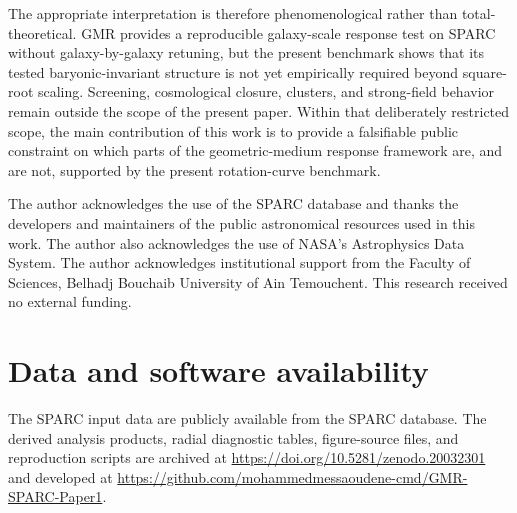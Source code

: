 ﻿\documentclass[twocolumn]{aastex701}
\begin{document}
The appropriate interpretation is therefore phenomenological rather than total-theoretical. GMR provides a reproducible galaxy-scale response test on SPARC without galaxy-by-galaxy retuning, but the present benchmark shows that its tested baryonic-invariant structure is not yet empirically required beyond square-root scaling. Screening, cosmological closure, clusters, and strong-field behavior remain outside the scope of the present paper. Within that deliberately restricted scope, the main contribution of this work is to provide a falsifiable public constraint on which parts of the geometric-medium response framework are, and are not, supported by the present rotation-curve benchmark.





 \begin{acknowledgments}
The author acknowledges the use of the SPARC database and thanks the developers and maintainers of the public astronomical resources used in this work. The author also acknowledges the use of NASA's Astrophysics Data System. The author acknowledges institutional support from the Faculty of Sciences, Belhadj Bouchaib University of Ain Temouchent. This research received no external funding.

\end{acknowledgments}
\section{Data and software availability}

The SPARC input data are publicly available from the SPARC database. The derived analysis products, radial diagnostic tables, figure-source files, and reproduction scripts are archived at \url{https://doi.org/10.5281/zenodo.20032301} and developed at \url{https://github.com/mohammedmessaoudene-cmd/GMR-SPARC-Paper1}.


 
 
\end{document}
